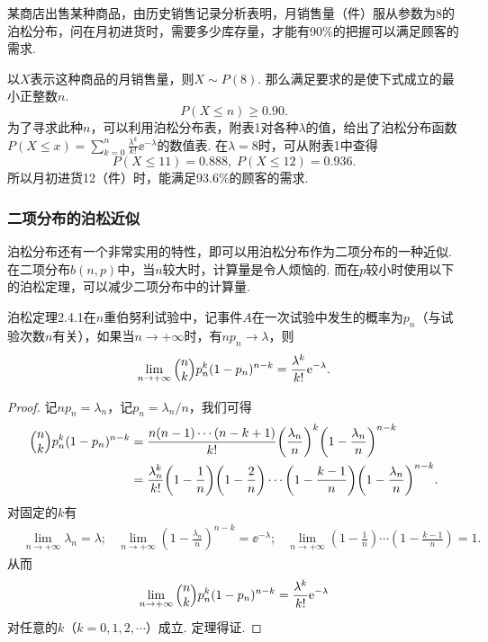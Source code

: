 \begin{example}
  某商店出售某种商品，由历史销售记录分析表明，月销售量（件）服从参数为8的泊松分布，问在月初进货时，需要多少库存量，才能有90\%的把握可以满足顾客的需求.
\end{example}
\begin{solution}
  以$X$表示这种商品的月销售量，则$X\sim P(8)$. 那么满足要求的是使下式成立的最小正整数$n$.
  \[
    P(X \le n ) \ge 0.90.
  \]
  为了寻求此种$n$，可以利用泊松分布表，附表1对各种$\lambda$的值，给出了泊松分布函数$P(X\le x)=\sum_{k=0}^{n}\frac{\lambda^k}{k!}\ee^{-\lambda}$的数值表. 在$\lambda=8$时，可从附表1中查得
  \[
    P(X \le 11) = 0.888,\; P(X\le 12 ) = 0.936.
  \]
  所以月初进货12（件）时，能满足93.6\%的顾客的需求.
\end{solution}

\subsubsection{二项分布的泊松近似}
泊松分布还有一个非常实用的特性，即可以用泊松分布作为二项分布的一种近似.在二项分布$b(n,p)$中，当$n$较大时，计算量是令人烦恼的. 而在$p$较小时使用以下的泊松定理，可以减少二项分布中的计算量.

\begin{theorem}{泊松定理}{2.4.1}在$n$重伯努利试验中，记事件$A$在一次试验中发生的概率为$p_n$（与试验次数$n$有关），如果当$n\to+\infty$时，有$np_n\to\lambda$，则
\begin{equation}\label{eq2.4.4}
  \lim_{n\to+\infty} \Binom nk p_n^k(1-p_n)^{n-k}
  = \frac{\lambda^k}{k!}\ee^{-\lambda}.
\end{equation}
\end{theorem}

\begin{proof}
  记$np_n=\lambda_n$，记$p_n=\lambda_n/n$，我们可得
  \begin{align*}
    \Binom nk p_n^k(1-p_n)^{n-k} & = \frac{n(n-1)\cdots(n-k+1)}{k!}\left( \frac{\lambda_n}n \right)^k \left( 1 - \frac{\lambda_n}n \right)^{n-k} \\
    & = \frac{\lambda_n^k}{k!}\left( 1 - \frac1n \right)\left( 1 - \frac2n \right) \cdots
    \left( 1 - \frac{k-1}n \right)
    \left( 1 - \frac{\lambda_n}n \right)^{n-k}.
  \end{align*}
  对固定的$k$有
  \begin{align*}
    & \lim_{n\to+\infty}\lambda_n = \lambda ;
    & \lim_{n\to+\infty}\left( 1 - \frac{\lambda_n}n \right)^{n-k} = \ee^{-\lambda} ;
    & \lim_{n\to+\infty}\left( 1 - \frac1n \right) \cdots \left( 1 - \frac{k-1}n \right) = 1.
  \end{align*}
  从而
  \[
    \lim_{n\to+\infty} \Binom nk p_n^k(1-p_n)^{n-k}  = \frac{\lambda^k}{k!}\ee^{-\lambda}
  \]
  对任意的$k$（$k=0,1,2,\cdots$）成立. 定理得证.
\end{proof}


